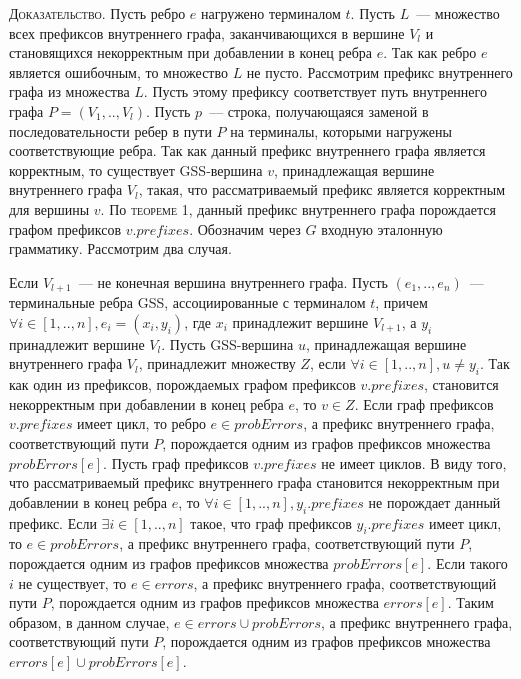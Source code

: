 \textsc{Доказательство.}
Пусть ребро $e$ нагружено терминалом $t$. Пусть $L$~--- множество всех префиксов внутреннего графа, заканчивающихся в вершине $V_{l}$ и становящихся некорректным при добавлении в конец ребра $e$. Так как ребро $e$ является ошибочным, то множество $L$ не пусто. Рассмотрим префикс внутреннего графа из множества $L$. Пусть этому префиксу соответствует путь внутреннего графа $P = (V_{1},..,V_{l})$. Пусть $p$~--- строка, получающаяся заменой в последовательности ребер в пути $P$ на терминалы, которыми нагружены соответствующие ребра. Так как данный префикс внутреннего графа является корректным, то существует GSS-вершина $v$, принадлежащая вершине внутреннего графа $V_{l}$, такая, что рассматриваемый префикс является корректным для вершины $v$. По \textsc{теореме 1}, данный префикс внутреннего графа порождается графом префиксов $v.prefixes$. Обозначим через $G$ входную эталонную грамматику. Рассмотрим два случая.

Если $V_{l+1}$~--- не конечная вершина внутреннего графа. Пусть $(e_{1},..,e_{n})$~--- терминальные ребра GSS, ассоциированные с терминалом $t$, причем $\forall i \in [1,..,n], e_{i} = (x_{i},y_{i})$, где $x_{i}$ принадлежит вершине $V_{l+1}$, а $y_{i}$ принадлежит вершине $V_{l}$. Пусть GSS-вершина $u$, принадлежащая вершине внутреннего графа $V_{l}$, принадлежит множеству $Z$, если $\forall i \in [1,..,n], u \neq y_{i}$. Так как один из префиксов, порождаемых графом префиксов $v.prefixes$, становится некорректным при добавлении в конец ребра $e$, то $v \in Z$. Если граф префиксов $v.prefixes$ имеет цикл, то ребро $e \in probErrors$, а префикс внутреннего графа, соответствующий пути $P$, порождается одним из графов префиксов множества $probErrors[e]$. Пусть граф префиксов $v.prefixes$ не имеет циклов. В виду того, что рассматриваемый префикс внутреннего графа становится некорректным при добавлении в конец ребра $e$, то $\forall i \in [1,..,n], y_{i}.prefixes$ не порождает данный префикс. Если $\exists i \in [1,..,n]$ такое, что граф префиксов $y_{i}.prefixes$ имеет цикл, то $e \in probErrors$, а префикс внутреннего графа, соответствующий пути $P$, порождается одним из графов префиксов множества $probErrors[e]$. Если такого $i$ не существует, то $e \in errors$, а префикс внутреннего графа, соответствующий пути $P$, порождается одним из графов префиксов множества $errors[e]$. Таким образом, в данном случае,  $e \in errors \cup probErrors$, а префикс внутреннего графа, соответствующий пути $P$, порождается одним из графов префиксов множества $errors[e] \cup probErrors[e]$.

